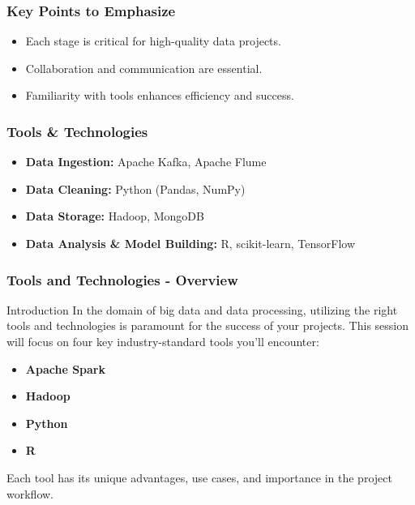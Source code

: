 \documentclass[aspectratio=169]{beamer}
\begin{document}
\begin{frame}[fragile]
    \frametitle{Key Points to Emphasize}
    \begin{itemize}
        \item Each stage is critical for high-quality data projects.
        \item Collaboration and communication are essential.
        \item Familiarity with tools enhances efficiency and success.
    \end{itemize}
\end{frame}

\begin{frame}[fragile]
    \frametitle{Tools \& Technologies}
    \begin{itemize}
        \item \textbf{Data Ingestion:} Apache Kafka, Apache Flume
        \item \textbf{Data Cleaning:} Python (Pandas, NumPy)
        \item \textbf{Data Storage:} Hadoop, MongoDB
        \item \textbf{Data Analysis \& Model Building:} R, scikit-learn, TensorFlow
    \end{itemize}
\end{frame}

\begin{frame}
    \frametitle{Tools and Technologies - Overview}
    \begin{block}{Introduction}
        In the domain of big data and data processing, utilizing the right tools and technologies is paramount for the success of your projects. This session will focus on four key industry-standard tools you'll encounter: 
        \begin{itemize}
            \item \textbf{Apache Spark}
            \item \textbf{Hadoop}
            \item \textbf{Python}
            \item \textbf{R}
        \end{itemize}
        Each tool has its unique advantages, use cases, and importance in the project workflow.
    \end{block}
\end{frame}
\end{document}
